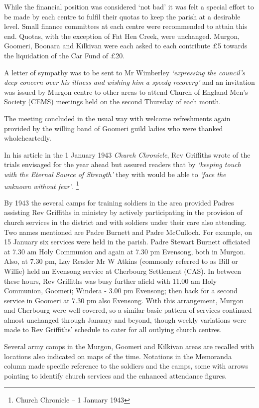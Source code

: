 While the financial position was considered `not bad' it was felt a special effort to be made by each centre to fulfil their quotas to keep the parish at a desirable level. Small finance committees at each centre were recommended to attain this end. Quotas, with the exception of Fat Hen Creek, were unchanged. Murgon, Goomeri, Boonara and Kilkivan were each asked to each contribute £5 towards the liquidation of the Car Fund of £20.

A letter of sympathy was to be sent to Mr Wimberley \emph{`expressing the council's deep concern over his illness and wishing him a speedy recovery'} and an invitation was issued by Murgon centre to other areas to attend Church of England Men's Society (CEMS) meetings held on the second Thursday of each month.

The meeting concluded in the usual way with welcome refreshments again provided by the willing band of Goomeri guild ladies who were thanked wholeheartedly.

In his article in the 1 January 1943 \emph{Church Chronicle}, Rev Griffiths wrote of the trials envisaged for the year ahead but assured readers that by \emph{`keeping touch with the Eternal Source of Strength'} they with would be able to \emph{`face the unknown without fear'}. \footnote{Church Chronicle -- 1 January 1943}

By 1943 the several camps for training soldiers in the area provided Padres assisting Rev Griffiths in ministry by actively participating in the provision of church services in the district and with soldiers under their care also attending. Two names mentioned are Padre Burnett and Padre McCulloch. For example, on 15 January six services were held in the parish. Padre Stewart Burnett officiated at 7.30 am Holy Communion and again at 7.30 pm Evensong, both in Murgon. Also, at 7.30 pm, Lay Reader Mr W Atkins (commonly referred to as Bill or Willie) held an Evensong service at Cherbourg Settlement (CAS). In between these hours, Rev Griffiths was busy further afield with 11.00 am Holy Communion, Goomeri; Windera - 3.00 pm Evensong; then back for a second service in Goomeri at 7.30 pm also Evensong. With this arrangement, Murgon and Cherbourg were well covered, so a similar basic pattern of services continued almost unchanged through January and beyond, though weekly variations were made to Rev Griffiths' schedule to cater for all outlying church centres.

Several army camps in the Murgon, Goomeri and Kilkivan areas are recalled with locations also indicated on maps of the time. Notations in the Memoranda column made specific reference to the soldiers and the camps, some with arrows pointing to identify church services and the enhanced attendance figures.

